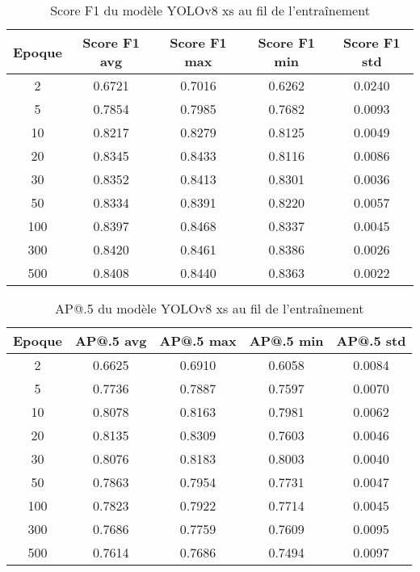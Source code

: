 \begin{table}[!ht]
    \caption{Score F1 du modèle YOLOv8 xs au fil de l'entraînement}
    \label{tab:yolov8xs_f1score}
    \centering
    \begin{tabular}{ |c||c|c|c|c|  }
        \hline
        \rowcolor{gray!50}
        Epoque & Score F1 avg & Score F1 max & Score F1 min & Score F1 std\\
        \hline
        2 & 0.6721 & 0.7016 & 0.6262 & 0.0240\\
        5 & 0.7854 & 0.7985 & 0.7682 & 0.0093\\
        10 & 0.8217 & 0.8279 & 0.8125 & 0.0049\\
        20 & 0.8345 & 0.8433 & 0.8116 & 0.0086\\
        30 & 0.8352 & 0.8413 & 0.8301 & 0.0036\\
        50 & 0.8334 & 0.8391 & 0.8220 & 0.0057\\
        100 & 0.8397 & 0.8468 & 0.8337 & 0.0045\\
        300 & 0.8420 & 0.8461 & 0.8386 & 0.0026\\
        500 & 0.8408 & 0.8440 & 0.8363 & 0.0022\\
        \hline
    \end{tabular}
\end{table}

\begin{table}[!ht]
    \caption{AP@.5 du modèle YOLOv8 xs au fil de l'entraînement}
    \label{tab:yolov8xs_ap50}
    \centering
    \begin{tabular}{ |c||c|c|c|c|  }
        \hline
        \rowcolor{gray!50}
        Epoque & AP@.5 avg & AP@.5 max & AP@.5 min & AP@.5 std\\
        \hline
        2 & 0.6625 & 0.6910 & 0.6058 & 0.0084\\
        5 & 0.7736 & 0.7887 & 0.7597 & 0.0070\\
        10 & 0.8078 & 0.8163 & 0.7981 & 0.0062\\
        20 & 0.8135 & 0.8309 & 0.7603 & 0.0046\\
        30 & 0.8076 & 0.8183 & 0.8003 & 0.0040\\
        50 & 0.7863 & 0.7954 & 0.7731 & 0.0047\\
        100 & 0.7823 & 0.7922 & 0.7714 & 0.0045\\
        300 & 0.7686 & 0.7759 & 0.7609 & 0.0095\\
        500 & 0.7614 & 0.7686 & 0.7494 & 0.0097\\
        \hline
    \end{tabular}
\end{table}

